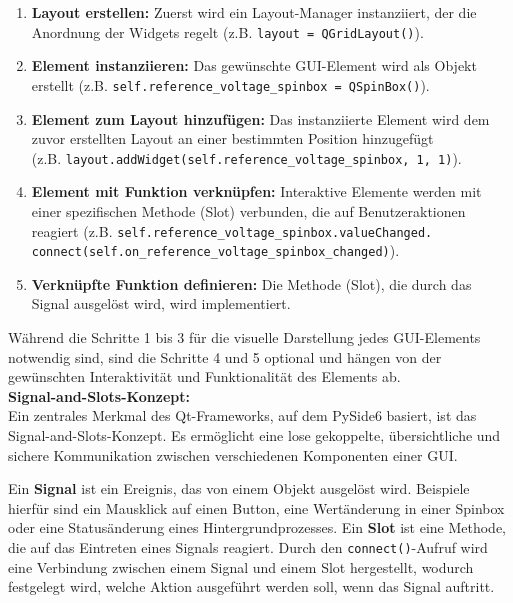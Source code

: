 \documentclass[a4paper, portrait, 12pt]{scrartcl} %
\begin{document}
\begin{enumerate}[label=\arabic*.] %
    \item \textbf{Layout erstellen:} Zuerst wird ein Layout-Manager instanziiert, der die Anordnung der Widgets regelt (z.B. \texttt{layout = QGridLayout()}).
    \item \textbf{Element instanziieren:} Das gewünschte GUI-Element wird als Objekt erstellt (z.B. \texttt{self.reference\_voltage\_spinbox = QSpinBox()}).
    \item \textbf{Element zum Layout hinzufügen:} Das instanziierte Element wird dem zuvor erstellten Layout an einer bestimmten Position hinzugefügt\\ (z.B. \texttt{layout.addWidget(self.reference\_voltage\_spinbox, 1, 1)}).
    \item \textbf{Element mit Funktion verknüpfen:} Interaktive Elemente werden mit einer spezifischen Methode (Slot) verbunden, die auf Benutzeraktionen reagiert (z.B. \texttt{self.reference\_voltage\_spinbox.valueChanged.\\connect(self.on\_reference\_voltage\_spinbox\_changed)}).
    \item \textbf{Verknüpfte Funktion definieren:} Die Methode (Slot), die durch das Signal ausgelöst wird, wird implementiert.
\end{enumerate}
{\footnotesize Während die Schritte 1 bis 3 für die visuelle Darstellung jedes GUI-Elements notwendig sind, sind die Schritte 4 und 5 optional und hängen von der gewünschten Interaktivität und Funktionalität des Elements ab.}\\

\textbf{Signal-and-Slots-Konzept:}\\
\label{par:signal_slots}
Ein zentrales Merkmal des Qt-Frameworks, auf dem PySide6 basiert, ist das Signal-and-Slots-Konzept. Es ermöglicht eine lose gekoppelte, übersichtliche und sichere Kommunikation zwischen verschiedenen Komponenten einer GUI.

Ein \textbf{Signal} ist ein Ereignis, das von einem Objekt ausgelöst wird. Beispiele hierfür sind ein Mausklick auf einen Button, eine Wertänderung in einer Spinbox oder eine Statusänderung eines Hintergrundprozesses. Ein \textbf{Slot} ist eine Methode, die auf das Eintreten eines Signals reagiert. Durch den \texttt{connect()}-Aufruf wird eine Verbindung zwischen einem Signal und einem Slot hergestellt, wodurch festgelegt wird, welche Aktion ausgeführt werden soll, wenn das Signal auftritt.
\end{document}
